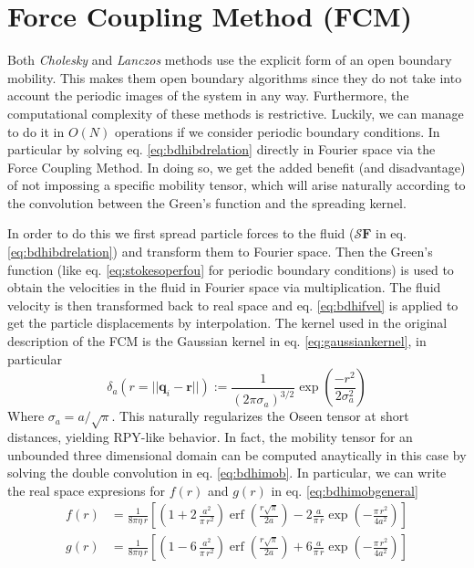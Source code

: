 \documentclass[ twoside,openright,titlepage,numbers=noenddot,%
headinclude,footinclude,cleardoublepage=empty,abstract=on,
BCOR=5mm,paper=a4,fontsize=11pt, dvipsnames
]{scrreprt}
\renewcommand{\vec}[1]{\bm{#1}}
\newcommand{\oper}[1]{\mathcal{#1}}
\DeclareMathOperator{\erf}{erf}
\newcommand{\ppos}{q}
\newcommand{\fpos}{r}
\begin{document}
\section{Force Coupling Method (FCM)}\label{sec:fcm}
Both \emph{Cholesky} and \emph{Lanczos} methods use the explicit form of an open boundary mobility. This makes them open boundary algorithms since they do not take into account the periodic images of the system in any way. Furthermore, the computational complexity of these methods is restrictive. Luckily, we can manage to do it in $O(N)$ operations if we consider periodic boundary conditions. In particular by solving eq. \eqref{eq:bdhibdrelation} directly in Fourier space via the Force Coupling Method\cite{Keaveny2014}. In doing so, we get the added benefit (and disadvantage) of not impossing a specific mobility tensor, which will arise naturally according to the convolution between the Green's function and the spreading kernel.

In order to do this we first spread particle forces to the fluid ($\oper{S}\vec{F}$ in eq. \eqref{eq:bdhibdrelation}) and transform them to Fourier space. Then the Green's function (like eq. \eqref{eq:stokesoperfou} for periodic boundary conditions) is used to obtain the velocities in the fluid in Fourier space via multiplication. The fluid velocity is then transformed back to real space and eq. \eqref{eq:bdhifvel} is applied to get the particle displacements by interpolation.
The kernel used in the original description of the \gls{FCM} is the Gaussian kernel in eq. \eqref{eq:gaussiankernel}, in particular
\begin{equation}
  \label{eq:fcmkernel}
  \delta_a(r = ||\vec{\ppos}_i - \vec{\fpos}||) := \frac{1}{(2\pi\sigma_a)^{3/2}}\exp\left(\frac{-r^2}{2\sigma_a^2}\right)
\end{equation}
Where $\sigma_a = a/\sqrt{\pi}$. This naturally regularizes the Oseen tensor at short distances, yielding \gls{RPY}-like behavior. In fact, the mobility tensor for an unbounded three dimensional domain can be computed anaytically in this case by solving the double convolution in eq. \eqref{eq:bdhimob}. In particular, we can write the real space expresions for $f(r)$ and $g(r)$ in eq. \eqref{eq:bdhimobgeneral}
\begin{equation}
  \label{eq:fcmmob}
  \begin{aligned}
f(r) & =  \frac{1}{8\pi\eta\,r}\left[\left(1+2\,\frac{a^{2}}{\pi\,r^{2}}\right){\erf}\left(\frac{r\sqrt{\pi}}{2a}\right)-2\frac{a}{\pi\,r}\exp\left(-\frac{\pi\,r^{2}}{4a^{2}}\right)\right]\\
g(r) & =  \frac{1}{8\pi\eta\,r}\left[\left(1-6\,\frac{a^{2}}{\pi\,r^{2}}\right){\erf}\left(\frac{r\sqrt{\pi}}{2a}\right)+6\frac{a}{\pi\,r}\exp\left(-\frac{\pi\,r^{2}}{4a^{2}}\right)\right]
  \end{aligned}
\end{equation}
\end{document}
